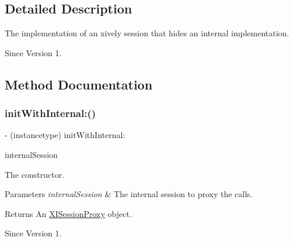 \subsection{Detailed Description}
The implementation of an xively session that hides an internal implementation. 

\begin{DoxySince}{Since}
Version 1. 
\end{DoxySince}


\subsection{Method Documentation}
\hypertarget{interface_x_i_session_proxy_a16ae3a74b593a05e61585a8de35cbeb0}{}\label{interface_x_i_session_proxy_a16ae3a74b593a05e61585a8de35cbeb0} 
\subsubsection{\texorpdfstring{init\+With\+Internal\+:()}{initWithInternal:()}}
{\footnotesize\ttfamily -\/ (instancetype) init\+With\+Internal\+: \begin{DoxyParamCaption}\item[{(\hyperlink{interface_x_i_session_internal}{X\+I\+Session\+Internal} $\ast$)}]{internal\+Session }\end{DoxyParamCaption}}



The constructor. 


\begin{DoxyParams}{Parameters}
{\em internal\+Session} & The internal session to proxy the calls. \\
\hline
\end{DoxyParams}
\begin{DoxyReturn}{Returns}
An \hyperlink{interface_x_i_session_proxy}{X\+I\+Session\+Proxy} object. 
\end{DoxyReturn}
\begin{DoxySince}{Since}
Version 1. 
\end{DoxySince}
\hypertarget{interface_x_i_session_proxy_a10db38a5c03b5a880268bc87ee6df0c1}{}\label{interface_x_i_session_proxy_a10db38a5c03b5a880268bc87ee6df0c1} 
